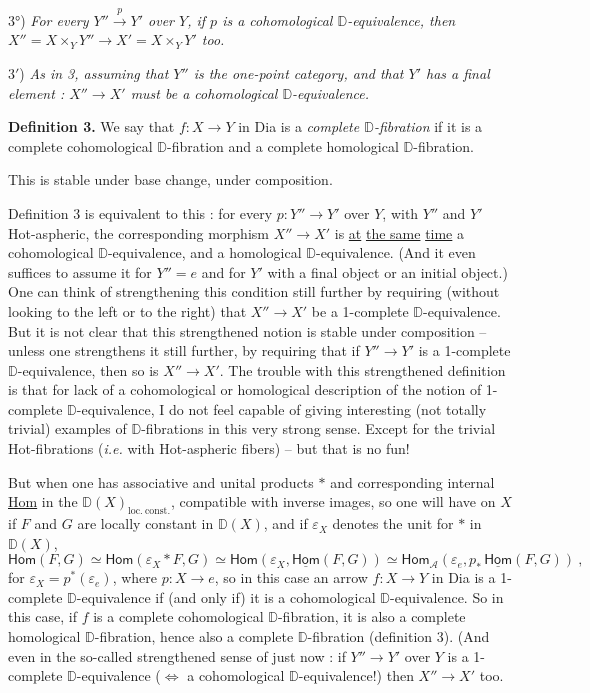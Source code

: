\documentclass[11pt]{article}
\newcommand{\msp}[1]{\marginpar{\footnotesize [#1]}}
\newcommand{\Hot}{\textsf{Hot}}
\newcommand{\Dia}{\textsf{Dia}}
\newcommand{\Hom}{\textsf{Hom}}
\newcommand{\DD}{\mathbb{D}}
\begin{document}
3°) \textit{For every $Y'' \overset{p}{\to} Y'$ over $Y$, if $p$ is a cohomological $\DD$-equivalence, then $X'' = X \times_Y Y'' \longrightarrow X' = X \times_Y Y'$ too.}

3$'$) \textit{As in 3, assuming that $Y''$ is the one-point category, and that $Y'$ has a final element : $X'' \to X'$ must be a cohomological $\DD$-equivalence.}

\msp{page 105}
\textbf{Definition 3.} We say that $f : X \to Y$ in \Dia{} is a \textit{complete $\DD$-fibration} if it is a complete cohomological $\DD$-fibration and a complete homological $\DD$-fibration.

This is stable under base change, under composition.

Definition 3 is equivalent to this : for every $p : Y'' \to Y'$ over $Y$, with $Y''$ and $Y'$ \Hot-aspheric, the corresponding morphism $X'' \to X'$ is \underline{at} \underline{the same} \underline{time} a cohomological $\DD$-equivalence, and a homological $\DD$-equivalence. (And it even suffices to assume it for $Y'' = e$ and for $Y'$ with a final object or an initial object.) One can think of strengthening this condition still further by requiring (without looking to the left or to the right) that $X'' \to X'$ be a 1-complete $\DD$-equivalence. But it is not clear that this strengthened notion is stable under composition – unless one strengthens it still further, by requiring that if $Y'' \to Y'$ is a 1-complete $\DD$-equivalence, then so is $X'' \to X'$. The trouble with this strengthened definition is that for lack of a cohomological or homological description of the notion of
\msp{page 106}
1-complete $\DD$-equivalence, I do not feel capable of giving interesting (not totally trivial) examples of $\DD$-fibrations in this very strong sense. Except for the trivial \Hot-fibrations (\textit{i.e.} with \Hot-aspheric fibers) – but that is no fun!

But when one has associative and unital products $*$ and corresponding internal \underline{\Hom} in the $\DD(X)_{\mathrm{loc.\ const.}}$, compatible with inverse images, so one will have on $X$ if $F$ and $G$ are locally constant in $\DD(X)$, and if $\varepsilon_X$ denotes the unit for $*$ in $\DD(X)$,
\[
\Hom(F,G) \simeq \Hom(\varepsilon_X * F, G) \simeq \Hom(\varepsilon_X, \underline{\Hom}(F,G)) \simeq \Hom_{\mathcal{A}}(\varepsilon_e, p_*\, \underline{\Hom}(F,G)) \ ,
\]
for $\varepsilon_X = p^*(\varepsilon_e)$, where $p : X \to e$, so in this case an arrow $f : X \to Y$ in \Dia{} is a 1-complete $\DD$-equivalence if (and only if) it is a cohomological $\DD$-equivalence. So in this case, if $f$ is a complete cohomological $\DD$-fibration, it is also a complete homological $\DD$-fibration, hence also a complete $\DD$-fibration (definition 3). (And even in the so-called strengthened sense of just now : if $Y'' \to Y'$ over $Y$ is a 1-complete $\DD$-equivalence ($\Leftrightarrow$ a cohomological $\DD$-equivalence!) then $X'' \to X'$ too. %
\end{document}

